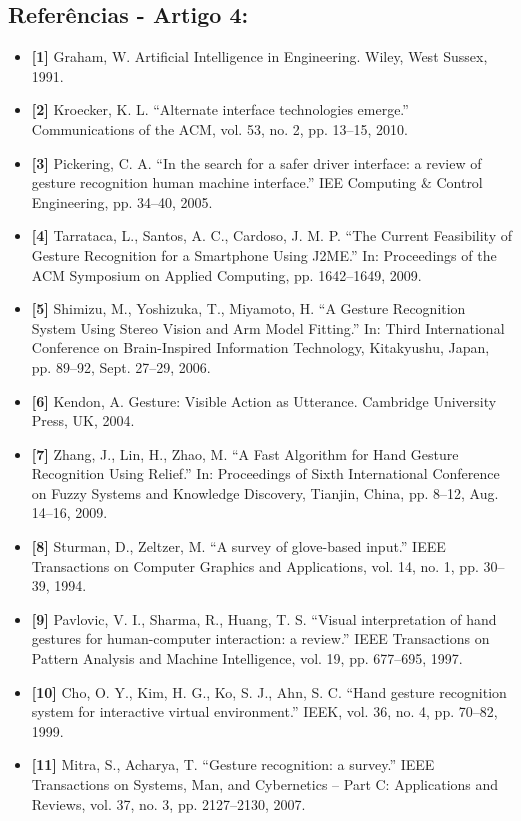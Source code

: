 \documentclass[12pt, a4paper]{article}
\begin{document}
\subsection{Referências - Artigo 4:}
\begin{itemize}[label=]
    \item \textbf{[1]} Graham, W. Artificial Intelligence in Engineering. Wiley, West Sussex, 1991.
    \item \textbf{[2]} Kroecker, K. L. “Alternate interface technologies emerge.” Communications of the ACM, vol. 53, no. 2, pp. 13–15, 2010.
    \item \textbf{[3]} Pickering, C. A. “In the search for a safer driver interface: a review of gesture recognition human machine interface.” IEE Computing \& Control Engineering, pp. 34–40, 2005.
    \item \textbf{[4]} Tarrataca, L., Santos, A. C., Cardoso, J. M. P. “The Current Feasibility of Gesture Recognition for a Smartphone Using J2ME.” In: Proceedings of the ACM Symposium on Applied Computing, pp. 1642–1649, 2009.
    \item \textbf{[5]} Shimizu, M., Yoshizuka, T., Miyamoto, H. “A Gesture Recognition System Using Stereo Vision and Arm Model Fitting.” In: Third International Conference on Brain-Inspired Information Technology, Kitakyushu, Japan, pp. 89–92, Sept. 27–29, 2006.
    \item \textbf{[6]} Kendon, A. Gesture: Visible Action as Utterance. Cambridge University Press, UK, 2004.
    \item \textbf{[7]} Zhang, J., Lin, H., Zhao, M. “A Fast Algorithm for Hand Gesture Recognition Using Relief.” In: Proceedings of Sixth International Conference on Fuzzy Systems and Knowledge Discovery, Tianjin, China, pp. 8–12, Aug. 14–16, 2009.
    \item \textbf{[8]} Sturman, D., Zeltzer, M. “A survey of glove-based input.” IEEE Transactions on Computer Graphics and Applications, vol. 14, no. 1, pp. 30–39, 1994.
    \item \textbf{[9]} Pavlovic, V. I., Sharma, R., Huang, T. S. “Visual interpretation of hand gestures for human-computer interaction: a review.” IEEE Transactions on Pattern Analysis and Machine Intelligence, vol. 19, pp. 677–695, 1997.
    \item \textbf{[10]} Cho, O. Y., Kim, H. G., Ko, S. J., Ahn, S. C. “Hand gesture recognition system for interactive virtual environment.” IEEK, vol. 36, no. 4, pp. 70–82, 1999.
    \item \textbf{[11]} Mitra, S., Acharya, T. “Gesture recognition: a survey.” IEEE Transactions on Systems, Man, and Cybernetics – Part C: Applications and Reviews, vol. 37, no. 3, pp. 2127–2130, 2007.

\end{itemize}
\end{document}
